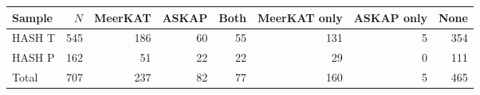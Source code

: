 \begin{tabular}{lrrrrrrr}
\toprule
Sample & $N$ & MeerKAT & ASKAP & Both & MeerKAT only & ASKAP only & None \\
\midrule
HASH T & 545 & 186 & 60 & 55 & 131 & 5 & 354 \\
HASH P & 162 & 51 & 22 & 22 & 29 & 0 & 111 \\
\midrule
Total & 707 & 237 & 82 & 77 & 160 & 5 & 465 \\
\bottomrule
\end{tabular}
